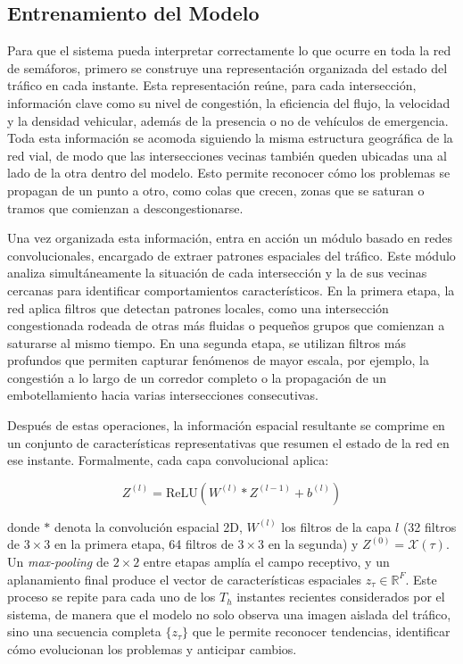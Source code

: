 \documentclass[12pt,a4paper,oneside]{report}
\begin{document}
\subsection{Entrenamiento del Modelo}\label{entrenamiento-del-modelo}

Para que el sistema pueda interpretar correctamente lo que ocurre en toda la red de semáforos, primero se construye una representación organizada del estado del tráfico en cada instante. Esta representación reúne, para cada intersección, información clave como su nivel de congestión, la eficiencia del flujo, la velocidad y la densidad vehicular, además de la presencia o no de vehículos de emergencia. Toda esta información se acomoda siguiendo la misma estructura geográfica de la red vial, de modo que las intersecciones vecinas también queden ubicadas una al lado de la otra dentro del modelo. Esto permite reconocer cómo los problemas se propagan de un punto a otro, como colas que crecen, zonas que se saturan o tramos que comienzan a descongestionarse.

Una vez organizada esta información, entra en acción un módulo basado en redes convolucionales, encargado de extraer patrones espaciales del tráfico. Este módulo analiza simultáneamente la situación de cada intersección y la de sus vecinas cercanas para identificar comportamientos característicos. En la primera etapa, la red aplica filtros que detectan patrones locales, como una intersección congestionada rodeada de otras más fluidas o pequeños grupos que comienzan a saturarse al mismo tiempo. En una segunda etapa, se utilizan filtros más profundos que permiten capturar fenómenos de mayor escala, por ejemplo, la congestión a lo largo de un corredor completo o la propagación de un embotellamiento hacia varias intersecciones consecutivas.

Después de estas operaciones, la información espacial resultante se comprime en un conjunto de características representativas que resumen el estado de la red en ese instante. Formalmente, cada capa convolucional aplica:

\begin{equation}
Z^{(l)} = \mathrm{ReLU}\!\left(W^{(l)} * Z^{(l - 1)} + b^{(l)}\right)
\label{eq:conv}
\end{equation}

donde \(*\) denota la convolución espacial 2D, \(W^{(l)}\) los filtros de la capa \(l\) (32 filtros de \(3 \times 3\) en la primera etapa, 64 filtros de \(3 \times 3\) en la segunda) y \(Z^{(0)} = \mathcal{X}(\tau)\). Un \emph{max-pooling} de \(2 \times 2\) entre etapas amplía el campo receptivo, y un aplanamiento final produce el vector de características espaciales \(z_{\tau} \in \mathbb{R}^{F}\). Este proceso se repite para cada uno de los \(T_{h}\) instantes recientes considerados por el sistema, de manera que el modelo no solo observa una imagen aislada del tráfico, sino una secuencia completa \(\{z_{\tau}\}\) que le permite reconocer tendencias, identificar cómo evolucionan los problemas y anticipar cambios.
\end{document}
